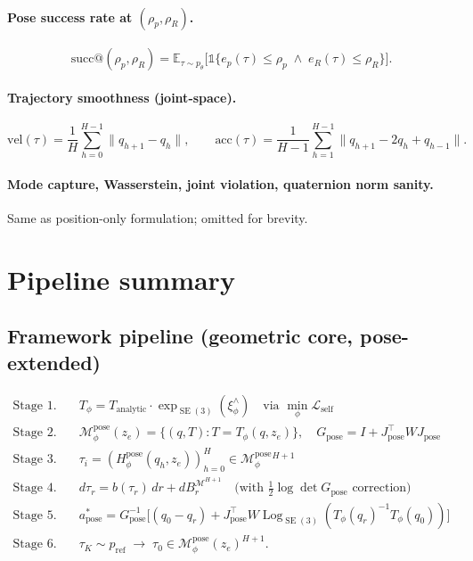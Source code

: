 \documentclass[11pt,a4paper]{article}
\DeclareMathOperator{\Log}{Log}
\DeclareMathOperator{\SE}{SE}
\newcommand{\E}{\mathbb{E}}
\newcommand{\Loss}{\mathcal{L}}
\newcommand{\Mset}{\mathcal{M}}
\newcommand{\Mpose}{\mathcal{M}_\phi^{\text{pose}}}
\newcommand{\Tphi}{T_\phi}
\newcommand{\Hpose}{H_\phi^{\text{pose}}}
\newcommand{\Jpose}{J_{\text{pose}}}
\begin{document}
\paragraph{Pose success rate at $(\rho_p, \rho_R)$.}
\begin{equation}
\text{succ}@(\rho_p, \rho_R) = \E_{\tau \sim p_\theta} \bigl[ \mathbb{1}\{ e_p(\tau) \leq \rho_p \;\land\; e_R(\tau) \leq \rho_R \} \bigr].
\end{equation}

\paragraph{Trajectory smoothness (joint-space).}
\begin{equation}
\text{vel}(\tau) = \frac{1}{H} \sum_{h=0}^{H-1} \| q_{h+1} - q_h \|, \qquad \text{acc}(\tau) = \frac{1}{H-1} \sum_{h=1}^{H-1} \| q_{h+1} - 2 q_h + q_{h-1} \|.
\end{equation}

\paragraph{Mode capture, Wasserstein, joint violation, quaternion norm sanity.} Same as position-only formulation; omitted for brevity.

\section{Pipeline summary}

\subsection{Framework pipeline (geometric core, pose-extended)}

\begin{align}
\text{Stage 1.}\quad & \Tphi = T_{\text{analytic}} \cdot \exp_{\SE(3)}(\xi_\phi^\wedge) \quad \text{via } \min_\phi \Loss_{\text{self}} \\
\text{Stage 2.}\quad & \Mpose(z_e) = \{(q, T) : T = \Tphi(q, z_e)\}, \quad G_{\text{pose}} = I + \Jpose^\top W \Jpose \\
\text{Stage 3.}\quad & \tau_i = (\Hpose(q_h, z_e))_{h=0}^H \in \Mpose^{H+1} \\
\text{Stage 4.}\quad & d\tau_r = b(\tau_r) \, dr + dB^{\Mset^{H+1}}_r \quad \text{(with } \tfrac{1}{2}\log\det G_{\text{pose}} \text{ correction)} \\
\text{Stage 5.}\quad & a^*_{\text{pose}} = G_{\text{pose}}^{-1} \bigl[ (q_0 - q_r) + \Jpose^\top W \Log_{\SE(3)}(\Tphi(q_r)^{-1} \Tphi(q_0)) \bigr] \\
\text{Stage 6.}\quad & \tau_K \sim p_{\text{ref}} \;\to\; \tau_0 \in \Mpose(z_e)^{H+1}.
\end{align}
\end{document}
